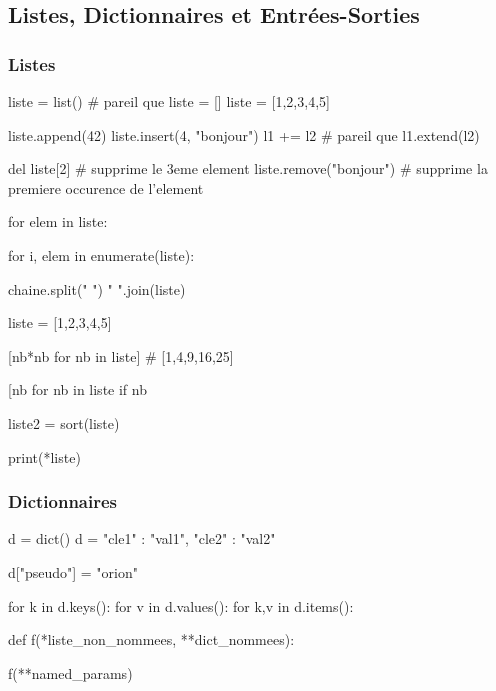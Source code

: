 \documentclass{beamer}
\let\oldsubsubsection\subsubsection
\renewcommand{\subsubsection}[2][]{\def\currentsubsubsection{#2}\oldsubsubsection[#1]{#2}}
\begin{document}
\subsection{Listes, Dictionnaires et Entrées-Sorties}

\subsubsection{Listes}

\begin{code}{\codeboxa}
liste = list() # pareil que liste = []
liste = [1,2,3,4,5]

liste.append(42)
liste.insert(4, "bonjour")
l1 += l2 # pareil que l1.extend(l2)
  
del liste[2] # supprime le 3eme element
liste.remove("bonjour")
# supprime la premiere occurence de l'element
\end{code}
\begin{code}{\codeboxb}
for elem in liste:
  
for i, elem in enumerate(liste):
  
chaine.split(" ")
" ".join(liste)
\end{code}
\begin{code}{\codeboxc}
liste = [1,2,3,4,5]
  
[nb*nb for nb in liste] # [1,4,9,16,25]
  
[nb for nb in liste if nb%
  
liste2 = sort(liste)
  
print(*liste)
\end{code}
\begin{frame}
  \begin{overprint}
    \usebox\codeboxa
    \usebox\codeboxb
    \usebox\codeboxc
  \end{overprint}
\end{frame}

\subsubsection{Dictionnaires}
\begin{code}{\codebox}
d = dict()
d = {"cle1" : "val1", "cle2" : "val2"}
  
d["pseudo"] = "orion"

for k in d.keys():
for v in d.values():
for k,v in d.items():

def f(*liste_non_nommees, **dict_nommees):

f(**named_params)
\end{code}
\begin{frame}
  \usebox\codebox
\end{frame}
\end{document}

